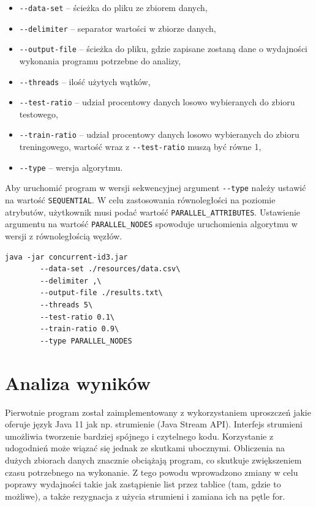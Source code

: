 \documentclass[12pt]{article}
\begin{document}
{\renewcommand\labelitemi{}
\begin{itemize}
    \item \verb|--data-set| -- ścieżka do pliku ze zbiorem danych,
    \item \verb|--delimiter| -- separator wartości w zbiorze danych,
    \item \verb|--output-file| -- ścieżka do pliku, gdzie zapisane zostaną dane o wydajności wykonania programu potrzebne do analizy,
    \item \verb|--threads| -- ilość użytych wątków,
    \item \verb|--test-ratio| -- udział procentowy danych losowo wybieranych do zbioru testowego,
    \item \verb|--train-ratio| -- udział procentowy danych losowo wybieranych do zbioru treningowego, wartość wraz z \verb|--test-ratio| muszą być równe 1,
    \item \verb|--type| -- wersja algorytmu.
\end{itemize}}

Aby uruchomić program w wersji sekwencyjnej argument \verb|--type| należy ustawić na wartość \verb|SEQUENTIAL|.
W celu zastosowania równoległości na poziomie atrybutów, użytkownik musi podać wartość \verb|PARALLEL_ATTRIBUTES|.
Ustawienie argumentu na wartość \verb|PARALLEL_NODES| spowoduje uruchomienia algorytmu w wersji z równoległością węzłów.

\begin{lstlisting}[caption=Przykładowe uruchomienie programu,frame=single]
    java -jar concurrent-id3.jar
        --data-set ./resources/data.csv\
        --delimiter ,\
        --output-file ./results.txt\
        --threads 5\
        --test-ratio 0.1\
        --train-ratio 0.9\
        --type PARALLEL_NODES
\end{lstlisting}

\newpage
\section{Analiza wyników}

Pierwotnie program został zaimplementowany z wykorzystaniem uproszczeń jakie oferuje język Java 11
jak np. strumienie (Java Stream API). Interfejs strumieni umożliwia tworzenie
bardziej spójnego i czytelnego kodu. Korzystanie z udogodnień może wiązać się jednak ze skutkami ubocznymi.
Obliczenia na dużych zbiorach danych znacznie obciążają program, co skutkuje zwiększeniem czasu
potrzebnego na wykonanie. Z tego powodu wprowadzono zmiany w celu poprawy wydajności
takie jak zastąpienie list przez tablice (tam, gdzie to możliwe), a także rezygnacja
z użycia strumieni i zamiana ich na pętle for.
\end{document}
